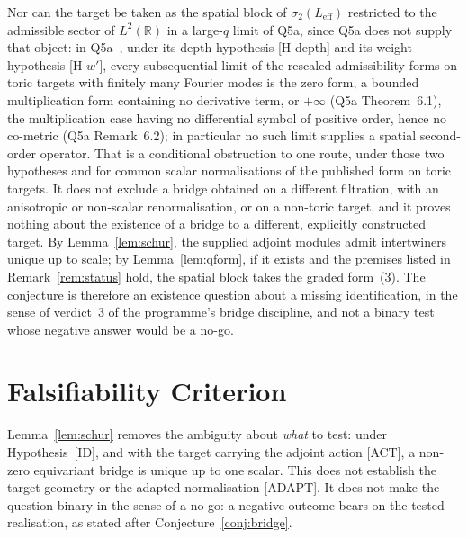 \documentclass[11pt,a4paper]{article}
\begin{document}
    Nor can the target be taken as the spatial block of $\sigma_2(L_{\mathrm{eff}})$ restricted
    to the admissible sector of $L^2(\mathbb{R})$ in a large-$q$ limit of Q5a, since Q5a does not
    supply that object: in Q5a~\cite{Beau2026q5a}, under its depth hypothesis [H-depth] and its weight hypothesis
    [H-$w'$], every subsequential limit of the rescaled admissibility forms on toric targets with
    finitely many Fourier modes is the zero form, a bounded multiplication form containing no
    derivative term, or $+\infty$ (Q5a Theorem~6.1), the multiplication case having no
    differential symbol of positive order, hence no co-metric (Q5a Remark~6.2); in particular no
    such limit supplies a spatial second-order operator.
    That is a conditional obstruction to one route, under those two hypotheses and for common
    scalar normalisations of the published form on toric targets.
    It does not exclude a bridge obtained on a different filtration, with an anisotropic or
    non-scalar renormalisation, or on a non-toric target, and it proves nothing about the
    existence of a bridge to a different, explicitly constructed target.
    By Lemma~\ref{lem:schur}, the supplied adjoint modules admit intertwiners unique up to scale; by
    Lemma~\ref{lem:qform}, if it exists and the premises listed in Remark~\ref{rem:status} hold,
    the spatial block takes the graded form~(3).
    The conjecture is therefore an existence question about a missing identification, in the sense
    of verdict~3 of the programme's bridge discipline, and not a binary test whose negative answer
    would be a no-go.

  \section{Falsifiability Criterion}
  \label{sec:falsif}

  Lemma~\ref{lem:schur} removes the ambiguity about \emph{what} to test: under Hypothesis~[ID],
  and with the target carrying the adjoint action [ACT], a non-zero equivariant bridge is unique up
  to one scalar.
  This does not establish the target geometry or the adapted normalisation [ADAPT].
  It does not make the question binary in the sense of a no-go: a negative outcome bears on the
  tested realisation, as stated after Conjecture~\ref{conj:bridge}.
\end{document}
